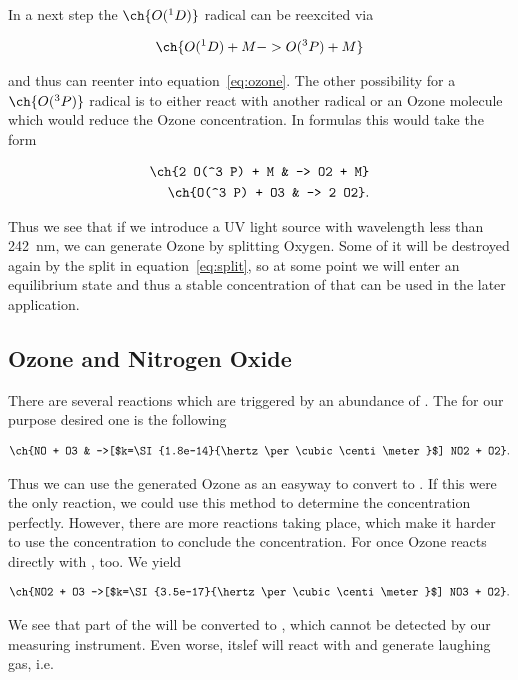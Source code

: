 In a next step the $\ch{O(^1 D)}$ radical can be reexcited via

\begin{align*}
  \ch{O(^1 D) + M -> O(^3 P) + M}
\end{align*}

and thus can reenter into equation~\eqref{eq:ozone}. The other
possibility for a $\ch{O(^3 P)}$ radical is to either react with
another radical or an Ozone molecule which would reduce the Ozone
concentration. In formulas this would take the form

\begin{align*}
  \ch{2 O(^3 P) + M & -> O2 + M}\\
  \ch{O(^3 P) + O3 & -> 2 O2}.
\end{align*}

Thus we see that if we introduce a UV light source with wavelength
less than \SI{242}{\nano\meter}, we can generate Ozone
by splitting Oxygen. Some of it will be destroyed again by the split
in equation~\eqref{eq:split}, so at some point we will enter an
equilibrium state and thus a stable concentration of  that can
be used in the later application.

\subsection{Ozone and Nitrogen Oxide}
\label{sec:o-no}

There are several reactions which are triggered by an abundance of
. The for our purpose desired one is the following

\begin{align*}
  \ch{NO + O3 & ->[$k=\SI{1.8e-14}{\hertz\per\cubic\centi\meter}$] NO2 + O2}.
\end{align*}

Thus we can use the generated Ozone as an easyway to convert 
to . If this were the only reaction, we could use this method
to determine the  concentration perfectly. However, there are
more reactions taking place, which make it harder to use the 
concentration to conclude the  concentration. For once Ozone
reacts directly with , too. We yield

\begin{align*}
  \ch{NO2 + O3 ->[$k=\SI{3.5e-17}{\hertz\per\cubic\centi\meter}$] NO3 + O2}.
\end{align*}

We see that part of the  will be converted to , which
cannot be detected by our measuring instrument. Even worse, 
itslef will react with  and generate laughing gas, i.e.

